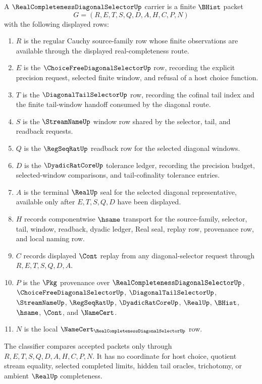 \begin{definition}
\label{def:real-completeness-diagonal-selector-carrier}
A $\RealCompletenessDiagonalSelectorUp$ carrier is a finite $\BHist$ packet
$$
G=(R,E,T,S,Q,D,A,H,C,P,N)
$$
with the following displayed rows:
\begin{enumerate}
\item $R$ is the regular Cauchy source-family row whose finite observations are available through the displayed real-completeness route.
\item $E$ is the $\ChoiceFreeDiagonalSelectorUp$ row, recording the explicit precision request, selected finite window, and refusal of a host choice function.
\item $T$ is the $\DiagonalTailSelectorUp$ row, recording the cofinal tail index and the finite tail-window handoff consumed by the diagonal route.
\item $S$ is the $\StreamNameUp$ window row shared by the selector, tail, and readback requests.
\item $Q$ is the $\RegSeqRatUp$ readback row for the selected diagonal windows.
\item $D$ is the $\DyadicRatCoreUp$ tolerance ledger, recording the precision budget, selected-window comparisons, and tail-cofinality tolerance entries.
\item $A$ is the terminal $\RealUp$ seal for the selected diagonal representative, available only after $E,T,S,Q,D$ have been displayed.
\item $H$ records componentwise $\hsame$ transport for the source-family, selector, tail, window, readback, dyadic ledger, Real seal, replay row, provenance row, and local naming row.
\item $C$ records displayed $\Cont$ replay from any diagonal-selector request through $R,E,T,S,Q,D,A$.
\item $P$ is the $\Pkg$ provenance over $\RealCompletenessDiagonalSelectorUp$, $\ChoiceFreeDiagonalSelectorUp$, $\DiagonalTailSelectorUp$, $\StreamNameUp$, $\RegSeqRatUp$, $\DyadicRatCoreUp$, $\RealUp$, $\BHist$, $\hsame$, $\Cont$, and $\NameCert$.
\item $N$ is the local $\NameCert_{\RealCompletenessDiagonalSelectorUp}$ row.
\end{enumerate}
The classifier compares accepted packets only through $R,E,T,S,Q,D,A,H,C,P,N$. It has no coordinate for host choice, quotient stream equality, selected completed limits, hidden tail oracles, trichotomy, or ambient $\RealUp$ completeness.
\end{definition}


